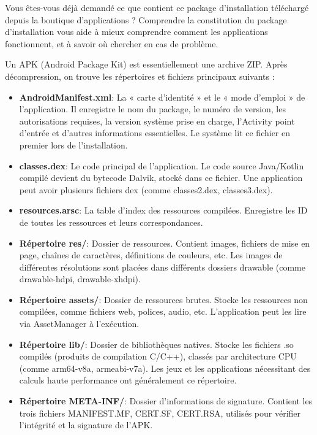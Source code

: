 
Vous êtes-vous déjà demandé ce que contient ce package d'installation téléchargé depuis la boutique d'applications ? Comprendre la constitution du package d'installation vous aide à mieux comprendre comment les applications fonctionnent, et à savoir où chercher en cas de problème.


Un APK (Android Package Kit) est essentiellement une archive ZIP. Après décompression, on trouve les répertoires et fichiers principaux suivants :

\begin{itemize}
  \item \textbf{AndroidManifest.xml}: La « carte d'identité » et le « mode d'emploi » de l'application. Il enregistre le nom du package, le numéro de version, les autorisations requises, la version système prise en charge, l'Activity point d'entrée et d'autres informations essentielles. Le système lit ce fichier en premier lors de l'installation.
  \item \textbf{classes.dex}: Le code principal de l'application. Le code source Java/Kotlin compilé devient du bytecode Dalvik, stocké dans ce fichier. Une application peut avoir plusieurs fichiers dex (comme classes2.dex, classes3.dex).
  \item \textbf{resources.arsc}: La table d'index des ressources compilées. Enregistre les ID de toutes les ressources et leurs correspondances.
  \item \textbf{Répertoire res/}: Dossier de ressources. Contient images, fichiers de mise en page, chaînes de caractères, définitions de couleurs, etc. Les images de différentes résolutions sont placées dans différents dossiers drawable (comme drawable-hdpi, drawable-xhdpi).
  \item \textbf{Répertoire assets/}: Dossier de ressources brutes. Stocke les ressources non compilées, comme fichiers web, polices, audio, etc. L'application peut les lire via AssetManager à l'exécution.
  \item \textbf{Répertoire lib/}: Dossier de bibliothèques natives. Stocke les fichiers .so compilés (produits de compilation C/C++), classés par architecture CPU (comme arm64-v8a, armeabi-v7a). Les jeux et les applications nécessitant des calculs haute performance ont généralement ce répertoire.
  \item \textbf{Répertoire META-INF/}: Dossier d'informations de signature. Contient les trois fichiers MANIFEST.MF, CERT.SF, CERT.RSA, utilisés pour vérifier l'intégrité et la signature de l'APK.
\end{itemize}

